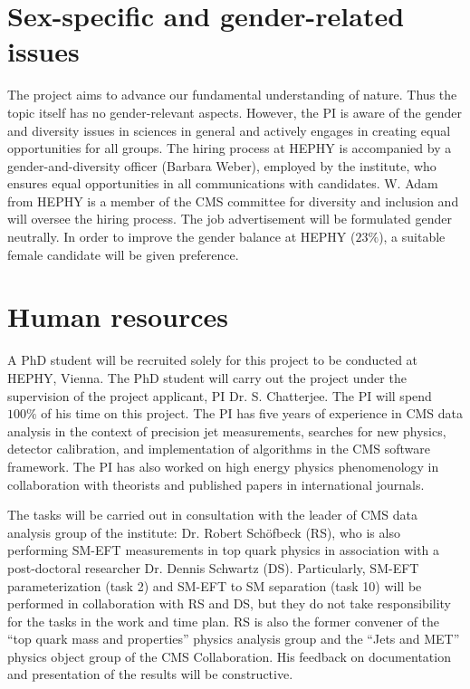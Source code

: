 \documentclass[a4paper,11pt]{article}
\begin{document}
\section{Sex-specific and gender-related issues}\label{sec:sex}
The project aims to advance our fundamental understanding of nature. 
Thus the topic itself has no gender-relevant aspects. 
However, the PI is aware of the gender and diversity issues in sciences in general and actively engages in creating equal opportunities for all groups. 
The hiring process at HEPHY is accompanied by a gender-and-diversity officer (Barbara Weber), employed by the institute, who ensures equal opportunities in all communications with candidates. 
W. Adam from HEPHY is a member of the CMS committee for diversity and inclusion and will oversee the hiring process. 
The job advertisement will be formulated gender neutrally. 
In order to improve the gender balance at HEPHY
($23\%$), a suitable female candidate will be given preference.

\section{Human resources}

A PhD student will be recruited solely for this project to be conducted at HEPHY, Vienna. 
The PhD student will carry out the project under the supervision of the project applicant, PI Dr. S. Chatterjee. 
The PI will spend $100\%$ of his time on this project. 
The PI has five years of experience in CMS data analysis in the context of precision jet measurements, searches for new physics, detector calibration, and implementation of algorithms in the CMS software framework. 
The PI has also worked on high energy physics phenomenology in collaboration with theorists and published papers in international journals. 

The tasks will be carried out in consultation with the leader of CMS data analysis group of the institute: Dr. Robert Sch{\"o}fbeck (RS), who is also performing SM-EFT measurements in top quark physics in association with a post-doctoral researcher Dr. Dennis Schwartz (DS). 
Particularly, SM-EFT parameterization (task 2) and SM-EFT to SM separation (task 10) will be performed in collaboration with RS and DS, but they do not take responsibility for the tasks in the work and time plan.
RS is also the former convener of the ``top quark mass and properties'' physics analysis group and the ``Jets and MET'' physics object group of the CMS Collaboration. 
His feedback on documentation and presentation of the results will be constructive. %
\end{document}
